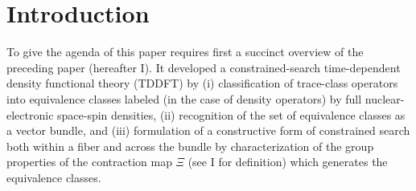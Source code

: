 \newpage

\newpage




\newpage


\section{Introduction}

To give the agenda of this paper requires first a succinct overview of the
preceding paper (hereafter I). It developed a constrained-search
time-dependent density functional theory (TDDFT) by (i) classification of
trace-class operators into equivalence classes labeled (in the case of
density operators) by full nuclear-electronic space-spin densities, (ii)
recognition of the set of equivalence classes as a vector bundle, and (iii)
formulation of a constructive form of constrained search both within a fiber
and across the bundle by characterization of the group properties of the
contraction map $\Xi $ (see I for definition) which generates the
equivalence classes.

